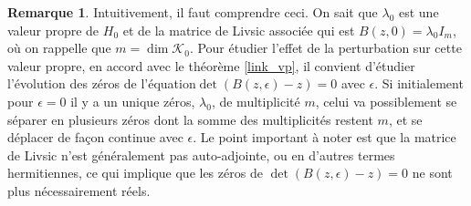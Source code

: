 \documentclass[12pt,openany,a4paper, titlepage]{article}
\theoremstyle{definition}
\theoremstyle{definition}
\theoremstyle{definition}
\theoremstyle{definition}
\theoremstyle{definition}
\newtheorem{rem}{Remarque}
\theoremstyle{definition}
\begin{document}
\begin{rem}
Intuitivement, il faut comprendre ceci. On sait que $\lambda_0$ est une valeur propre de $H_0$ et de la matrice de Livsic associée qui est $B(z,0) = \lambda_0 I_m$, où on rappelle que $m = \dim \mathcal{K}_0$. Pour étudier l'effet de la perturbation sur cette valeur propre, en accord avec le théorème \ref{link_vp}, il convient d'étudier l'évolution des zéros de l'équation$\det (B(z,\epsilon) - z) = 0$ avec $\epsilon$. Si initialement pour $\epsilon = 0$ il y a un unique zéros, $\lambda_0$, de multiplicité $m$, celui va possiblement se séparer en plusieurs zéros dont la somme des multiplicités restent $m$, et se déplacer de façon continue avec $\epsilon$. Le point important à noter est que la matrice de Livsic n'est généralement pas auto-adjointe, ou en d'autres termes hermitiennes, ce qui implique que les zéros de  $\det (B(z,\epsilon) - z) = 0$ ne sont plus nécessairement réels.

\begin{figure}
\centering



\begin{tikzpicture}[x=0.75pt,y=0.75pt,yscale=-1,xscale=1]


\end{tikzpicture}
\end{figure}
\end{rem}
\end{document}
